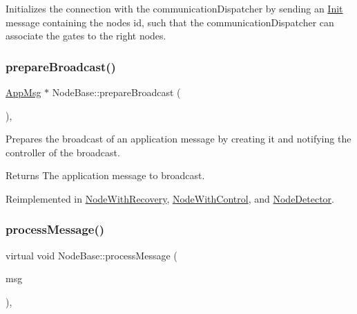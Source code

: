 Initializes the connection with the communication\+Dispatcher by sending an \hyperlink{class_init}{Init} message containing the node\textquotesingle{}s id, such that the communication\+Dispatcher can associate the gates to the right nodes. 

\mbox{\label{class_node_base_a66c1dee9d15119bc3e68da71067ff6cd}} 
\subsubsection{\texorpdfstring{prepare\+Broadcast()}{prepareBroadcast()}}
{\footnotesize\ttfamily \hyperlink{class_app_msg}{App\+Msg} $\ast$ Node\+Base\+::prepare\+Broadcast (\begin{DoxyParamCaption}{ }\end{DoxyParamCaption})\hspace{0.3cm}{\ttfamily [protected]}, {\ttfamily [virtual]}}



Prepares the broadcast of an application message by creating it and notifying the controller of the broadcast. 

\begin{DoxyReturn}{Returns}
The application message to broadcast. 
\end{DoxyReturn}


Reimplemented in \hyperlink{class_node_with_recovery_a33d8e8775fd69cb647b38a54b36e1ebe}{Node\+With\+Recovery}, \hyperlink{class_node_with_control_ab871014cf3f42d834f8d34ad5498174c}{Node\+With\+Control}, and \hyperlink{class_node_detector_af75cf37cc01fc51bc228a7a83c10cb97}{Node\+Detector}.

\mbox{\label{class_node_base_ae70b168f2bc7407c249594b1c614301c}} 
\subsubsection{\texorpdfstring{process\+Message()}{processMessage()}}
{\footnotesize\ttfamily virtual void Node\+Base\+::process\+Message (\begin{DoxyParamCaption}\item[{c\+Message $\ast$}]{msg }\end{DoxyParamCaption})\hspace{0.3cm}{\ttfamily [protected]}, {}}



